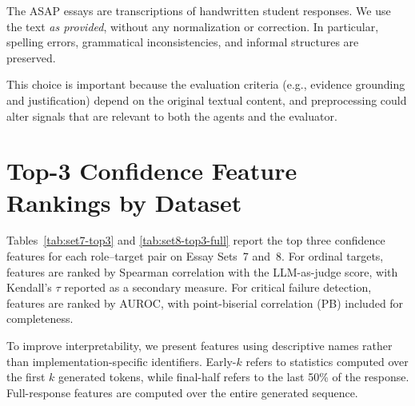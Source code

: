 \documentclass[11pt]{article}
\begin{document}
The ASAP essays are transcriptions of handwritten student responses. We use the text \emph{as provided}, without any normalization or correction. In particular, spelling errors, grammatical inconsistencies, and informal structures are preserved. 

This choice is important because the evaluation criteria (e.g., evidence grounding and justification) depend on the original textual content, and preprocessing could alter signals that are relevant to both the agents and the evaluator.

\section{Top-3 Confidence Feature Rankings by Dataset}
\label{app:proxy-rankings}

Tables~\ref{tab:set7-top3} and \ref{tab:set8-top3-full} report the top three confidence features for each role--target pair on Essay Sets~7 and~8. For ordinal targets, features are ranked by Spearman correlation with the LLM-as-judge score, with Kendall’s $\tau$ reported as a secondary measure. For critical failure detection, features are ranked by AUROC, with point-biserial correlation (PB) included for completeness.

To improve interpretability, we present features using descriptive names rather than implementation-specific identifiers. Early-$k$ refers to statistics computed over the first $k$ generated tokens, while final-half refers to the last 50\% of the response. Full-response features are computed over the entire generated sequence.
\end{document}

